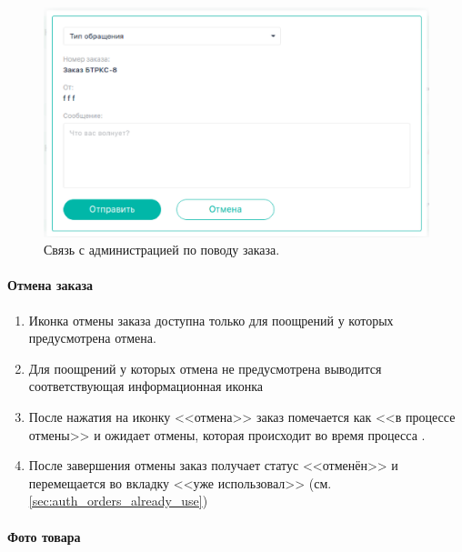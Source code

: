                 \begin{figure}
                    \center
                    \includegraphics[width=120mm]{04_auth_funcs/figures/11.eps}
                    \caption{Связь с администрацией по поводу заказа.}
                    \label{fig:auth_order_feedback}
                \end{figure}
                \paragraph{Отмена заказа}
                
                \begin{enumerate}
                    \item Иконка отмены заказа доступна только для поощрений у
                    которых предусмотрена отмена.
                    \item Для поощрений у которых отмена не предусмотрена
                    выводится соответствующая информационная иконка
                    \item После нажатия на иконку <<отмена>> заказ помечается
                    как <<в процессе отмены>> и ожидает отмены, которая
                    происходит во время процесса .
                    \item После завершения отмены заказ получает статус
                    <<отменён>> и перемещается во вкладку <<уже использовал>>
                    (см. \ref{sec:auth_orders_already_use})
                \end{enumerate}


                \paragraph{Фото товара}

